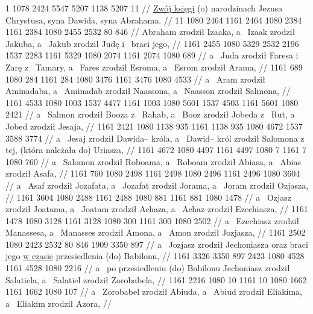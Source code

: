 \renewcommand{\chaptertitle}{}

\begingl
\noindent
\lettrine[loversize=1,lraise=-1.3]{1 }{}%
 {} 1078 2424 5547 5207 1138 5207 11
//
\glb
 \underline{Zwój księgi} (o) narodzinach Jezusa Chrystusa, syna Dawida, syna Abrahama.
//
\endgl
\begingl
\noindent
\gla
{} 11 1080 2464 1161 2464 1080 2384 1161 2384 1080 2455 2532 80 846
//
\glb
{} Abraham zrodził Izaaka, a~ Izaak zrodził Jakuba, a~ Jakub zrodził Judę i~ braci jego,
//
\endgl
\begingl
\gla
{} 1161 2455 1080 5329 2532 2196 1537 2283 1161 5329 1080 2074 1161 2074 1080 689
//
\glb
{} a~ Juda zrodził Faresa i~ Zarę z~ Tamary, a~ Fares zrodził Esroma, a~ Esrom zrodził Arama,
//
\endgl
\begingl
\gla
{} 1161 689 1080 284 1161 284 1080 3476 1161 3476 1080 4533
//
\glb
{} a~ Aram zrodził Aminadaba, a~ Aminadab zrodził Naassona, a~ Naasson zrodził Salmona,
//
\endgl
\begingl
\gla
{} 1161 4533 1080 1003 1537 4477 1161 1003 1080 5601 1537 4503 1161 5601 1080 2421
//
\glb
{} a~ Salmon zrodził Booza z~ Rahab, a~ Booz zrodził Jobeda z~ Rut, a~ Jobed zrodził Jesaja,
//
\endgl
\begingl
\gla
{} 1161 2421 1080 1138 935 1161 1138 935 1080 4672 1537 3588 {} 3774
//
\glb
{} a~ Jesaj zrodził Dawida– króla, a~ Dawid– król zrodził Salomona z~ tej, (która należała do) Uriasza,
//
\endgl
\begingl
\gla
{} 1161 4672 1080 4497 1161 4497 1080 7 1161 7 1080 760
//
\glb
{} a~ Salomon zrodził Roboama, a~ Roboam zrodził Abiasa, a~ Abias zrodził Asafa,
//
\endgl
\begingl
\gla
{} 1161 760 1080 2498 1161 2498 1080 2496 1161 2496 1080 3604
//
\glb
{} a~ Asaf zrodził Jozafata, a~ Jozafat zrodził Jorama, a~ Joram zrodził Ozjasza,
//
\endgl
\begingl
\gla
{} 1161 3604 1080 2488 1161 2488 1080 881 1161 881 1080 1478
//
\glb
{} a~ Ozjasz zrodził Joatama, a~ Joatam zrodził Achaza, a~ Achaz zrodził Ezechiasza,
//
\endgl
\begingl
\gla
{} 1161 1478 1080 3128 1161 3128 1080 300 1161 300 1080 2502
//
\glb
{} a~ Ezechiasz zrodził Manassesa, a~ Manasses zrodził Amona, a~ Amon zrodził Jozjasza,
//
\endgl
\begingl
\gla
{} 1161 2502 1080 2423 2532 80 846 1909 3350 {} 897
//
\glb
{} a~ Jozjasz zrodził Jechoniasza oraz braci jego \underline{w czasie} przesiedlenia (do) Babilonu,
//
\endgl
\begingl
\gla
{} 1161 3326 3350 {} 897 2423 1080 4528 1161 4528 1080 2216
//
\glb
{} a~ po przesiedleniu (do) Babilonu Jechoniasz zrodził Salatiela, a~ Salatiel zrodził Zorobabela,
//
\endgl
\begingl
\gla
{} 1161 2216 1080 10 1161 10 1080 1662 1161 1662 1080 107
//
\glb
{} a~ Zorobabel zrodził Abiuda, a~ Abiud zrodził Eliakima, a~ Eliakim zrodził Azora,
//
\endgl
\begingl
\gla
